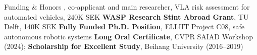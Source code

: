 \begin{rubric}{Funding \& Honors}
\entry*[2026]%
	, co-applicant and main researcher, VLA risk assessment for automated vehicles, 240K SEK
\entry*[2026 -- 2027]%
	\textbf{WASP Research Stint Abroad Grant}, TU Delft, 140K SEK
\entry*[2022 -- 2027]%
	\textbf{Fully Funded Ph.D. Position}, ELLIIT Project C08, safe autonomous robotic systems
\entry*[Honors]%
	\textbf{Long Oral Certificate}, CVPR SAIAD Workshop (2024); \textbf{Scholarship for Excellent Study}, Beihang University (2016--2019)
\end{rubric}